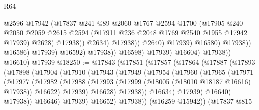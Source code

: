 \begin{lexlean}{R64}
\begin{coremodule}
                                            @2596
                                            @17942
                                            (@17837
                                              @241
                                              @89
                                              @2060
                                              @1767
                                              @2594
                                              @1700
                                              (@17905
                                                @240
                                                @2050
                                                @2059
                                                @2615
                                                @2594
                                                (@17911 @236 @2048 @1769 @2540 @1955 @17942 @17939)
                                                @2628)
                                              @17938))
                                          @2634)
                                        @17938))
                                    @2640)
                                  @17939)
                                @16580)
                              @17938))
                          @16586)
                        @17939)
                      @16592)
                    @17938))
                @16598)
              @17939)
            @16604)
          @17938))
      @16610)
    @17939
@18250 := @17843
    (@17851
      (@17857
        (@17864
          (@17887
            (@17893
              (@17898
                (@17904
                  (@17910
                    (@17943
                      (@17949
                        (@17954
                          (@17960
                            (@17965
                              (@17971
                                (@17977
                                  (@17982
                                    (@17988
                                      (@17993
                                        (@17999 (@18005 (@18010 @18187 @16616) @17938))
                                        @16622)
                                      @17939)
                                    @16628)
                                  @17938))
                              @16634)
                            @17939)
                          @16640)
                        @17938))
                    @16646)
                  @17939)
                @16652)
              @17938))
          (@16259 @15942))
        (@17837
          @815

\end{coremodule}
\end{lexlean}
